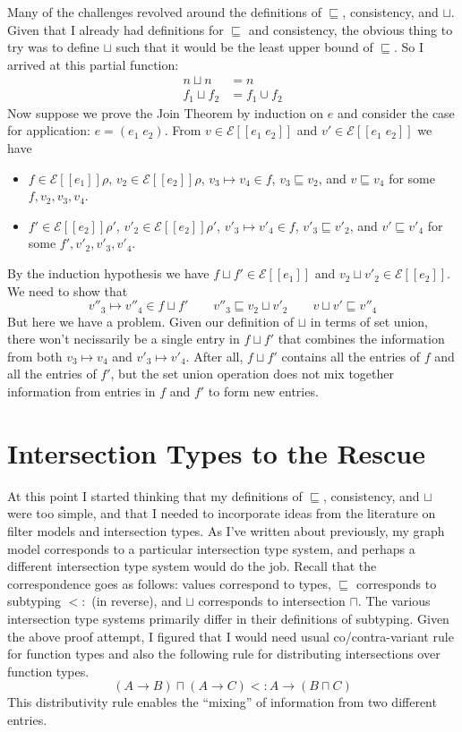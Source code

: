 \documentclass{article}
\newcommand{\app}[0]{\;}
\newcommand{\SEM}[1]{[\![ #1 ]\!]}
\newcommand{\ESEM}[1]{\mathcal{E}\SEM{#1}}
\begin{document}
Many of the challenges revolved around the definitions of
$\sqsubseteq$, consistency, and $\sqcup$. Given that I already had
definitions for $\sqsubseteq$ and consistency, the obvious thing to
try was to define $\sqcup$ such that it would be the least upper bound
of $\sqsubseteq$. So I arrived at this partial function:
\begin{align*}
  n \sqcup n &= n \\
  f_1 \sqcup f_2 &= f_1 \cup f_2
\end{align*}
Now suppose we prove the Join Theorem by induction on $e$ and consider
the case for application: $e = (e_1 \app e_2)$. From $v \in \ESEM{e_1
  \app e_2}$ and $v' \in \ESEM{e_1 \app e_2}$ we have
\begin{itemize}
\item $f \in \ESEM{e_1}\rho$, $v_2 \in \ESEM{e_2}\rho$,  
  $v_3 \mapsto v_4 \in f$, $v_3 \sqsubseteq v_2$, and $v \sqsubseteq v_4$
  for some $f, v_2, v_3, v_4$.
\item $f' \in \ESEM{e_2}\rho'$, $v'_2 \in \ESEM{e_2}\rho'$,   
  $v'_3 \mapsto v'_4 \in f$, $v'_3 \sqsubseteq v'_2$, and $v' \sqsubseteq v'_4$
  for some $f', v'_2, v'_3, v'_4$.
\end{itemize}
By the induction hypothesis we have $f \sqcup f' \in \ESEM{e_1}$
and $v_2 \sqcup v'_2 \in \ESEM{e_2}$.
We need to show that 
\[
   v''_3 \mapsto v''_4 \in f \sqcup f' 
   \qquad
   v''_3 \sqsubseteq v_2 \sqcup v'_2
   \qquad
   v \sqcup v' \sqsubseteq v''_4
\]
But here we have a problem. Given our definition of $\sqcup$ in terms
of set union, there won't necissarily be a single entry in $f \sqcup
f'$ that combines the information from both $v_3 \mapsto v_4$ and
$v'_3 \mapsto v'_4$. After all, $f \sqcup f'$ contains all the entries
of $f$ and all the entries of $f'$, but the set union operation does
not mix together information from entries in $f$ and $f'$ to form new
entries.

\section{Intersection Types to the Rescue}

At this point I started thinking that my definitions of $\sqsubseteq$,
consistency, and $\sqcup$ were too simple, and that I needed to
incorporate ideas from the literature on filter models and
intersection types. As I've written about previously, my graph model
corresponds to a particular intersection type system, and perhaps a
different intersection type system would do the job. Recall that the
correspondence goes as follows: values correspond to types,
$\sqsubseteq$ corresponds to subtyping $<:$ (in reverse), and $\sqcup$
corresponds to intersection $\sqcap$. The various intersection type
systems primarily differ in their definitions of subtyping.  Given the
above proof attempt, I figured that I would need usual
co/contra-variant rule for function types and also the following rule
for distributing intersections over function types.
\[
  (A\to B) \sqcap (A \to C) <: A \to (B \sqcap C)
\]
This distributivity rule enables the ``mixing'' of information from
two different entries.
\end{document}
